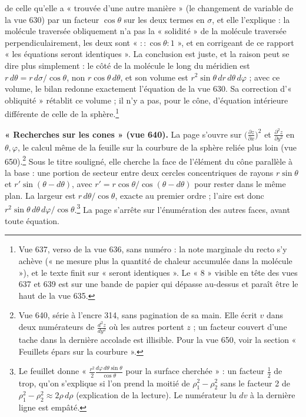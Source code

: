 \documentclass[11pt,a4paper]{article}
\begin{document}
de celle qu'elle a « trouvée d'une autre manière » (le changement de variable
de la vue 630) par un facteur $\cos\theta$ sur les deux termes en $\sigma$, et
elle l'explique : la molécule traversée obliquement n'a pas la « solidité » de
la molécule traversée perpendiculairement, les deux sont « $::\cos\theta : 1$ »,
et en corrigeant de ce rapport « les équations seront identiques ». La
conclusion est juste, et la raison peut se dire plus simplement : le côté de
la molécule le long du méridien est $r\,d\theta = r\,d\sigma/\cos\theta$, non
$r\cos\theta\,d\theta$, et son volume est $r^2\sin\theta\,dr\,d\theta\,d\varphi$
; avec ce volume, le bilan redonne exactement l'équation de la vue 630. Sa
correction d'« obliquité » rétablit ce volume ; il n'y a pas, pour le cône,
d'équation intérieure différente de celle de la sphère.\footnote{Vue 637, verso
de la vue 636, sans numéro : la note marginale du recto s'y achève (« ne mesure
plus la quantité de chaleur accumulée dans la molécule »), et le texte finit
sur « seront identiques ». Le « 8 » visible en tête des vues 637 et 639 est sur
une bande de papier qui dépasse au-dessus et paraît être le haut de la vue 635.}

\textbf{« Recherches sur les cones » (vue 640).} La page s'ouvre sur
$\big(\frac{\partial z}{\partial x}\big)^2$ et $\frac{\partial^2 z}{\partial
y^2}$ en $\theta, \varphi$, le calcul même de la feuille sur la courbure de la
sphère reliée plus loin (vue 650).\footnote{Vue 640, série à l'encre 314, sans
pagination de sa main. Elle écrit $v$ dans deux numérateurs de
$\frac{d^2z}{dy^2}$ où les autres portent $z$ ; un facteur couvert d'une tache
dans la dernière accolade est illisible. Pour la vue 650, voir la section
« Feuillets épars sur la courbure ».} Sous le titre souligné, elle cherche la
face de l'élément du cône parallèle à la base : une portion de secteur entre
deux cercles concentriques de rayons $r\sin\theta$ et $r'\sin(\theta -
d\theta)$, avec $r' = r\cos\theta/\cos(\theta - d\theta)$ pour rester dans le
même plan. La largeur est $r\,d\theta/\cos\theta$, exacte au premier ordre ;
l'aire est donc $r^2\sin\theta\,d\theta\,d\varphi/\cos\theta$.\footnote{Le
feuillet donne « $\frac{r^2}{2}\frac{d\varphi\,d\theta\sin\theta}{\cos\theta}$
pour la surface cherchée » : un facteur $\frac12$ de trop, qu'on s'explique si
l'on prend la moitié de $\rho_1^2 - \rho_2^2$ sans le facteur 2 de
$\rho_1^2 - \rho_2^2 \approx 2\rho\,d\rho$ (explication de la lecture). Le
numérateur lu $dv$ à la dernière ligne est empâté.} La page s'arrête sur
l'énumération des autres faces, avant toute équation.
\end{document}
